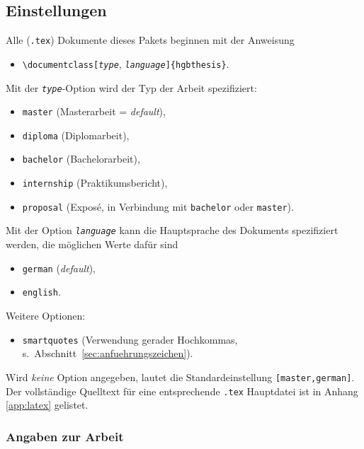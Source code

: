 \subsection{Einstellungen}
\label{sec:HagenbergEinstellungen}

Alle (\verb!.tex!) Dokumente dieses Pakets beginnen mit der Anweisung
%
\begin{itemize}
    \item[] \verb!\documentclass[!\texttt{\emph{type}},
    \texttt{\emph{language}}\verb!]{hgbthesis}!.
\end{itemize}
%
Mit der \texttt{\emph{type}}-Option wird der Typ der Arbeit spezifiziert:
%
\begin{itemize}
    \item[] \texttt{master} (Masterarbeit = \emph{default}),
    \item[] \texttt{diploma} (Diplomarbeit),
    \item[] \texttt{bachelor} (Bachelorarbeit),
    \item[] \texttt{internship} (Praktikumsbericht),
		\item[] \texttt{proposal} (Exposé, in Verbindung mit \texttt{bachelor} oder \texttt{master}).
\end{itemize}
%
Mit der Option \texttt{\emph{language}} kann die Hauptsprache des Dokuments
spezifiziert werden, die möglichen Werte dafür sind
%
\begin{itemize}
    \item[] \texttt{german} (\emph{default}),
    \item[] \texttt{english}.
\end{itemize}
%
Weitere Optionen:
%
\begin{itemize}
    \item[] \texttt{smartquotes} (Verwendung gerader Hochkommas,
	s.\ Abschnitt~\ref{sec:anfuehrungszeichen}).
\end{itemize}
%
Wird \emph{keine} Option angegeben, lautet die Standardeinstellung
\texttt{[master,german]}. Der vollständige Quelltext für eine entsprechende
\verb!.tex! Hauptdatei ist in Anhang \ref{app:latex} gelistet.

\subsubsection{Angaben zur Arbeit}

